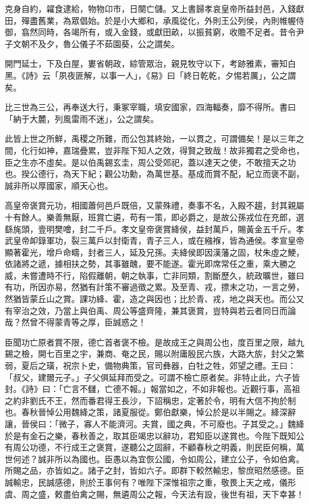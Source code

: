 \begin{pinyinscope}
克身自約，糴食逮給，物物卬市，日闋亡儲。又上書歸孝哀皇帝所益封邑，入錢獻田，殫盡舊業，為眾倡始。於是小大鄉和，承風從化，外則王公列侯，內則帷幄侍御，翕然同時，各竭所有，或入金錢，或獻田畝，以振貧窮，收贍不足者。昔令尹子文朝不及夕，魯公儀子不茹園葵，公之謂矣。

開門延士，下及白屋，婁省朝政，綜管眾治，親見牧守以下，考跡雅素，審知白黑。《詩》云「夙夜匪解，以事一人」，《易》曰「終日乾乾，夕惕若厲」，公之謂矣。

比三世為三公，再奉送大行，秉冢宰職，填安國家，四海輻奏，靡不得所。書曰「納于大麓，列風雷雨不迷」，公之謂矣。

此皆上世之所鮮，禹稷之所難，而公包其終始，一以貫之，可謂備矣！是以三年之間，化行如神，嘉瑞疊累，豈非陛下知人之效，得賢之致哉！故非獨君之受命也，臣之生亦不虛矣。是以伯禹錫玄圭，周公受郊祀，蓋以達天之使，不敢擅天之功也。揆公德行，為天下紀；觀公功勳，為萬世基。基成而賞不配，紀立而褒不副，誠非所以厚國家，順天心也。

高皇帝褒賞元功，相國蕭何邑戶既倍，又蒙殊禮，奏事不名，入殿不趨，封其親屬十有餘人。樂善無厭，班賞亡遴，苟有一策，即必爵之，是故公孫戎位在充郎，選繇旄頭，壹明樊噲，封二千戶。孝文皇帝褒賞絳侯，益封萬戶，賜黃金五千斤。孝武皇帝卹錄軍功，裂三萬戶以封衛青，青子三人，或在繈褓，皆為通侯。孝宣皇帝顯著霍光，增戶命疇，封者三人，延及兄孫。夫絳侯即因漢藩之固，杖朱虛之鯁，依諸將之遞，據相扶之勢，其事雖醜，要不能遂。霍光即席常任之重，乘大勝之威，未嘗遭時不行，陷假離朝，朝之執事，亡非同類，割斷歷久，統政曠世，雖曰有功，所因亦易，然猶有計策不審過徵之累。及至青、戎，摽末之功，一言之勞，然猶皆蒙丘山之賞。課功絳、霍，造之與因也；比於青、戎，地之與天也。而公又有宰治之效，乃當上與伯禹、周公等盛齊隆，兼其褒賞，豈特與若云者同日而論哉？然曾不得蒙青等之厚，臣誠惑之！

臣聞功亡原者賞不限，德亡首者褒不檢。是故成王之與周公也，度百里之限，越九錫之檢，開七百里之宇，兼商、奄之民，賜以附庸殷民六族，大路大旂，封父之繁弱，夏后之璜，祝宗卜史，備物典策，官司彝器，白牡之牲，郊望之禮。王曰：「叔父，建爾元子。」子父俱延拜而受之。可謂不檢亡原者矣。非特止此，六子皆封。《詩》曰：「亡言不讎，亡德不報。」報當如之，不如非報也。近觀行事，高祖之約非劉氏不王，然而番君得王長沙，下詔稱忠，定著於令，明有大信不拘於制也。春秋晉悼公用魏絳之策，諸夏服從。鄭伯獻樂，悼公於是以半賜之。絳深辭讓，晉侯曰：「微子，寡人不能濟河。夫賞，國之典，不可廢也。子其受之。」魏絳於是有金石之樂，春秋善之，取其臣竭忠以辭功，君知臣以遂賞也。今陛下既知公有周公功德，不行成王之褒賞，遂聽公之固辭，不顧春秋之明義，則民臣何稱，萬世何述？誠非所以為國也。臣愚以為宜恢公國，令如周公，建立公子，令如伯禽。所賜之品，亦皆如之。諸子之封，皆如六子。即群下較然輸忠，黎庶昭然感德。臣誠輸忠，民誠感德，則於王事何有？唯陛下深惟祖宗之重，敬畏上天之戒，儀形虞、周之盛，敕盡伯禽之賜，無遴周公之報，今天法有設，後世有祖，天下幸甚！


\end{pinyinscope}
